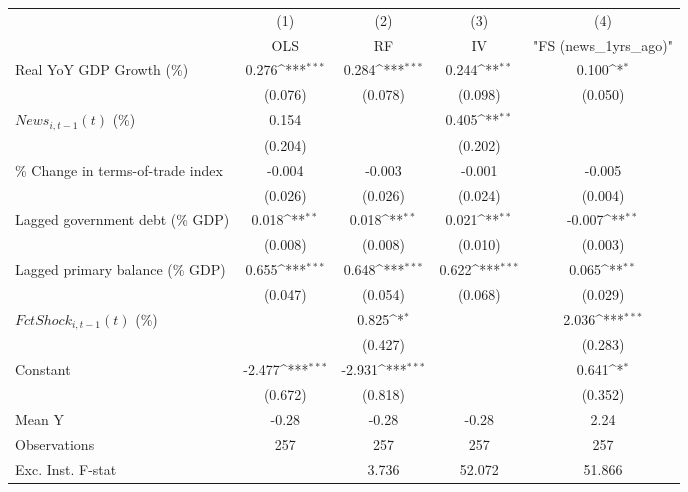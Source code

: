 {
\def\sym#1{\ifmmode^{#1}\else\(^{#1}\)\fi}
\begin{tabular}{l*{4}{c}}
\toprule
                    &\multicolumn{1}{c}{(1)}&\multicolumn{1}{c}{(2)}&\multicolumn{1}{c}{(3)}&\multicolumn{1}{c}{(4)}\\
                    &\multicolumn{1}{c}{OLS}&\multicolumn{1}{c}{RF}&\multicolumn{1}{c}{IV}&\multicolumn{1}{c}{ "FS (news_1yrs_ago)" }\\
\midrule
Real YoY GDP Growth (\%)&       0.276\sym{***}&       0.284\sym{***}&       0.244\sym{**} &       0.100\sym{*}  \\
                    &     (0.076)         &     (0.078)         &     (0.098)         &     (0.050)         \\
\addlinespace
$ News_{i,t-1}(t)$ (\%)&       0.154         &                     &       0.405\sym{**} &                     \\
                    &     (0.204)         &                     &     (0.202)         &                     \\
\addlinespace
\% Change in terms-of-trade index&      -0.004         &      -0.003         &      -0.001         &      -0.005         \\
                    &     (0.026)         &     (0.026)         &     (0.024)         &     (0.004)         \\
\addlinespace
Lagged government debt (\% GDP)&       0.018\sym{**} &       0.018\sym{**} &       0.021\sym{**} &      -0.007\sym{**} \\
                    &     (0.008)         &     (0.008)         &     (0.010)         &     (0.003)         \\
\addlinespace
Lagged primary balance (\% GDP)&       0.655\sym{***}&       0.648\sym{***}&       0.622\sym{***}&       0.065\sym{**} \\
                    &     (0.047)         &     (0.054)         &     (0.068)         &     (0.029)         \\
\addlinespace
$ FctShock_{i,t-1}(t)$ (\%)&                     &       0.825\sym{*}  &                     &       2.036\sym{***}\\
                    &                     &     (0.427)         &                     &     (0.283)         \\
\addlinespace
Constant            &      -2.477\sym{***}&      -2.931\sym{***}&                     &       0.641\sym{*}  \\
                    &     (0.672)         &     (0.818)         &                     &     (0.352)         \\
\midrule
Mean Y              &       -0.28         &       -0.28         &       -0.28         &        2.24         \\
Observations        &         257         &         257         &         257         &         257         \\
Exc. Inst. F-stat   &                     &       3.736         &      52.072         &      51.866         \\
\bottomrule
\end{tabular}
}
